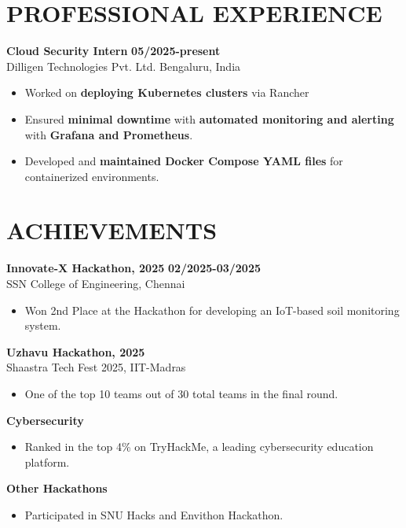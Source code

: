 \documentclass[10pt, letterpaper]{article} %
\begin{document}
\vspace{0.75em} %
\section*{PROFESSIONAL EXPERIENCE}
\textbf{Cloud Security Intern} \hfill \textbf{05/2025-present} \\
Dilligen Technologies Pvt. Ltd. \hfill Bengaluru, India
\begin{itemize}
    \item Worked on \textbf{deploying Kubernetes clusters} via Rancher
    \item Ensured \textbf{minimal downtime} with \textbf{automated monitoring and alerting} with \textbf{Grafana and Prometheus}.
    \item Developed and \textbf{maintained Docker Compose YAML files} for containerized environments.
\end{itemize}

\vspace{0.75em} %
\section*{ACHIEVEMENTS}
\textbf{Innovate-X Hackathon, 2025} \hfill \textbf{02/2025-03/2025} \\
SSN College of Engineering, Chennai
\begin{itemize}
    \item Won 2nd Place at the Hackathon for developing an IoT-based soil monitoring system.
\end{itemize}

\vspace{0.95em} %
\textbf{Uzhavu Hackathon, 2025} \\
Shaastra Tech Fest 2025, IIT-Madras
\begin{itemize}
    \item One of the top 10 teams out of 30 total teams in the final round.
\end{itemize}

\vspace{0.95em} %
\textbf{Cybersecurity}
\begin{itemize}
    \item Ranked in the top 4\% on TryHackMe, a leading cybersecurity education platform.
\end{itemize}

\vspace{0.95em} %
\textbf{Other Hackathons}
\begin{itemize}
    \item Participated in SNU Hacks and Envithon Hackathon.
\end{itemize}
\end{document}
